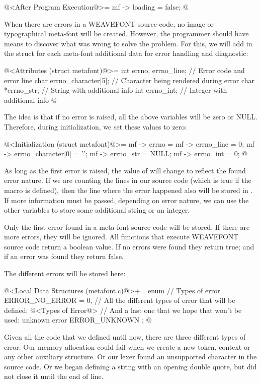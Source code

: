 \iniciocodigo
@<After Program Execution@>=
mf -> loading = false;
@
\fimcodigo


When there are errors in a WEAVEFONT source code, no image or
typographical meta-font will be created. However, the programmer
should have means to discover what was wrong to solve the problem. For
this, we will add in the struct for each meta-font additional data for
error handling and diagnostic:

\iniciocodigo
@<Attributes (struct metafont)@>=
  int errno, errno_line; // Error code and error line
  char errno_character[5]; // Character being rendered during error
  char *errno_str; // String with additional info
  int errno_int; // Integer with additional info
@
\fimcodigo

The idea is that if no error is raised, all the above variables will
be zero or NULL. Therefore, during initialization, we set these values
to zero:

\iniciocodigo
@<Initialization (struct metafont)@>=
mf -> errno = mf -> errno_line = 0;
mf -> errno_character[0] = '\0';
mf -> errno_str = NULL;
mf -> errno_int = 0;
@
\fimcodigo

As long as the first error is raised, the value of 
will change to reflect the found error nature. If we are counting the
lines in our source code (which is true if the
macro  is defined), then the line where
the error happened also will be stored in . If
more information must be passed, depending on error nature, we can use
the other variables to store some additional string or an integer.

Only the first error found in a meta-font source code will be
stored. If there are more errors, they will be ignored. All functions
that execute WEAVEFONT source code return a boolean value. If no
errors were found they return true; and if an error was found they
return false.

The different errors will be stored here:

\iniciocodigo
@<Local Data Structures (metafont.c)@>+=
enum { // Types of error
  ERROR_NO_ERROR = 0,
  // All the different types of error that will be defined:
  @<Types of Error@>
  // And a last one that we hope that won't be used: unknown error
  ERROR_UNKNOWN
};
@
\fimcodigo

Given all the code that we defined until now, there are three
different types of error. Our memory allocation could fail when we
create a new token, context or any other auxiliary structure. Or our
lexer found an unsupported character in the source code. Or we began
defining a string with an opening double quote, but did not close it
until the end of line.

